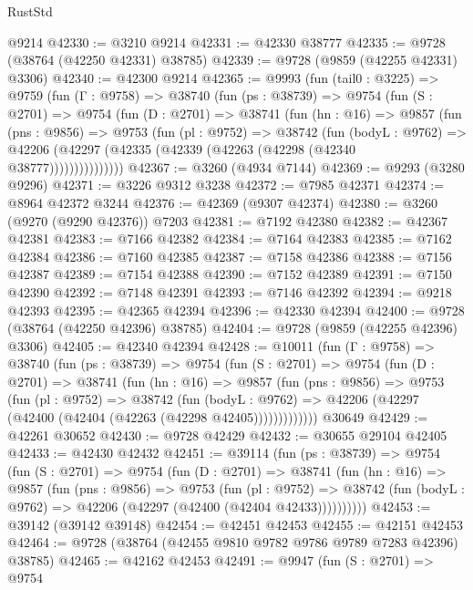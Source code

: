 \begin{lexlean}{RustStd}
\begin{coremodule}
    @9214
@42330 := @3210 @9214
@42331 := @42330 @38777
@42335 := @9728 (@38764 (@42250 @42331) @38785)
@42339 := @9728 (@9859 (@42255 @42331) @3306)
@42340 := @42300 @9214
@42365 := @9993
    (fun (tail0 : @3225) =>
    @9759
      (fun (Γ : @9758) =>
      @38740
        (fun (ps : @38739) =>
        @9754
          (fun (S : @2701) =>
          @9754
            (fun (D : @2701) =>
            @38741
              (fun (hn : @16) =>
              @9857
                (fun (pns : @9856) =>
                @9753
                  (fun (pl : @9752) =>
                  @38742
                    (fun (bodyL : @9762) =>
                    @42206 (@42297 (@42335 (@42339 (@42263 (@42298 (@42340 @38777)))))))))))))))
@42367 := @3260 (@4934 @7144)
@42369 := @9293 (@3280 @9296)
@42371 := @3226 @9312 @3238
@42372 := @7985 @42371
@42374 := @8964 @42372 @3244
@42376 := @42369 (@9307 @42374)
@42380 := @3260 (@9270 (@9290 @42376)) @7203
@42381 := @7192 @42380
@42382 := @42367 @42381
@42383 := @7166 @42382
@42384 := @7164 @42383
@42385 := @7162 @42384
@42386 := @7160 @42385
@42387 := @7158 @42386
@42388 := @7156 @42387
@42389 := @7154 @42388
@42390 := @7152 @42389
@42391 := @7150 @42390
@42392 := @7148 @42391
@42393 := @7146 @42392
@42394 := @9218 @42393
@42395 := @42365 @42394
@42396 := @42330 @42394
@42400 := @9728 (@38764 (@42250 @42396) @38785)
@42404 := @9728 (@9859 (@42255 @42396) @3306)
@42405 := @42340 @42394
@42428 := @10011
    (fun (Γ : @9758) =>
    @38740
      (fun (ps : @38739) =>
      @9754
        (fun (S : @2701) =>
        @9754
          (fun (D : @2701) =>
          @38741
            (fun (hn : @16) =>
            @9857
              (fun (pns : @9856) =>
              @9753
                (fun (pl : @9752) =>
                @38742
                  (fun (bodyL : @9762) =>
                  @42206 (@42297 (@42400 (@42404 (@42263 (@42298 @42405)))))))))))))
    @30649
@42429 := @42261 @30652
@42430 := @9728 @42429
@42432 := @30655 @29104 @42405
@42433 := @42430 @42432
@42451 := @39114
    (fun (ps : @38739) =>
    @9754
      (fun (S : @2701) =>
      @9754
        (fun (D : @2701) =>
        @38741
          (fun (hn : @16) =>
          @9857
            (fun (pns : @9856) =>
            @9753
              (fun (pl : @9752) =>
              @38742 (fun (bodyL : @9762) => @42206 (@42297 (@42400 (@42404 @42433))))))))))
@42453 := @39142 (@39142 @39148)
@42454 := @42451 @42453
@42455 := @42151 @42453
@42464 := @9728 (@38764 (@42455 @9810 @9782 @9786 @9789 @7283 @42396) @38785)
@42465 := @42162 @42453
@42491 := @9947
    (fun (S : @2701) =>
    @9754

\end{coremodule}
\end{lexlean}
